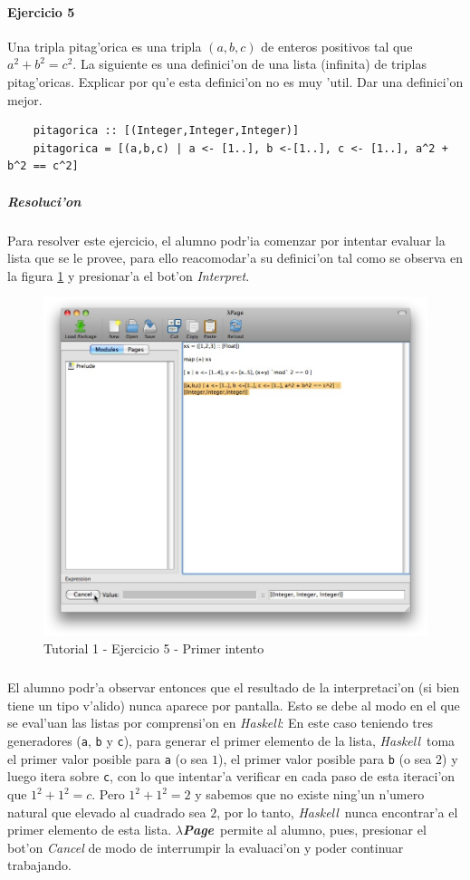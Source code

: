 \documentclass[a4paper]{article}
\newcommand{\haskell}{\textsl{Haskell}}
\newcommand{\hpage}{\textbf{\textsl{$\lambda$Page}}}
\begin{document}
\paragraph{Ejercicio 5}Una tripla pitag'orica es una tripla $(a,b,c)$ de enteros positivos tal que $a^{2} + b^{2} = c^{2}$.  La siguiente es una definici'on de una lista (infinita) de triplas pitag'oricas.  Explicar por qu'e esta definici'on no es muy 'util.  Dar una definici'on mejor.
\begin{lstlisting}
	pitagorica :: [(Integer,Integer,Integer)] 
	pitagorica = [(a,b,c) | a <- [1..], b <-[1..], c <- [1..], a^2 + b^2 == c^2]
\end{lstlisting}
\subparagraph{Resoluci'on}Para resolver este ejercicio, el alumno podr'ia comenzar por intentar evaluar la lista que se le provee, para ello reacomodar'a su definici'on tal como se observa en la figura \ref{tut103} y presionar'a el bot'on \textsl{Interpret}.
\begin{figure}[hp]
	\begin{center}
        	\includegraphics[width=.9\textwidth]{pictures/tut1/03}
		\caption{Tutorial 1 - Ejercicio 5 - Primer intento}
		\label{tut103}
	\end{center}
\end{figure}
\subparagraph{}El alumno podr'a observar entonces que el resultado de la interpretaci'on (si bien tiene un tipo v'alido) nunca aparece por pantalla.  Esto se debe al modo en el que se eval'uan las listas por comprensi'on en \haskell: En este caso teniendo tres generadores (\texttt{a}, \texttt{b} y \texttt{c}), para generar el primer elemento de la lista, \haskell\ toma el primer valor posible para \texttt{a} (o sea $1$), el primer valor posible para \texttt{b} (o sea $2$) y luego itera sobre \texttt{c}, con lo que intentar'a verificar en cada paso de esta iteraci'on que $1^{2} + 1^{2} = c$.  Pero $1^{2}+1^{2} = 2$ y sabemos que no existe ning'un n'umero natural que elevado al cuadrado sea $2$, por lo tanto, \haskell\ nunca encontrar'a el primer elemento de esta lista.  \hpage\ permite al alumno, pues, presionar el bot'on \textsl{Cancel} de modo de interrumpir la evaluaci'on y poder continuar trabajando.
\end{document}
